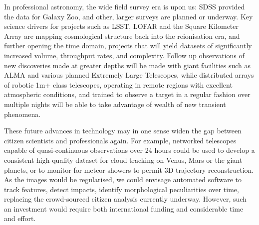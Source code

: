 \documentclass{ar2e}
\begin{document}

In professional astronomy, the wide field survey era is upon us: SDSS provided
the data for Galaxy Zoo, and other, larger surveys are planned or underway. Key
science drivers for projects such as LSST, LOFAR and the Square Kilometer Array
are mapping cosmological structure back into the reionisation era, and  further
opening the time domain, projects that will yield datasets of significantly
increased volume, throughput rates, and complexity.  Follow up observations of
new discoveries made at greater depths will be made with giant facilities such
as ALMA and various planned Extremely Large Telescopes, while distributed arrays
of robotic 1m+ class telescopes, operating in remote regions with excellent
atmospheric conditions, and trained to observe a target in a regular fashion
over multiple nights will be able to take advantage of wealth of new transient
phenomena. 

These future advances in technology may in one sense widen the gap between
citizen scientists and professionals again. For example, networked telescopes
capable of quasi-continuous observations over 24 hours could be used to develop
a consistent high-quality dataset for cloud tracking on Venus, Mars or the giant
planets, or to monitor for meteor showers to permit 3D trajectory
reconstruction.   As the images would be regularised, we could envisage
automated software to track features, detect impacts, identify morphological
peculiarities over time, replacing the crowd-sourced citizen analysis currently
underway.  However, such an investment would require both international funding
and considerable time and effort.


\end{document}
